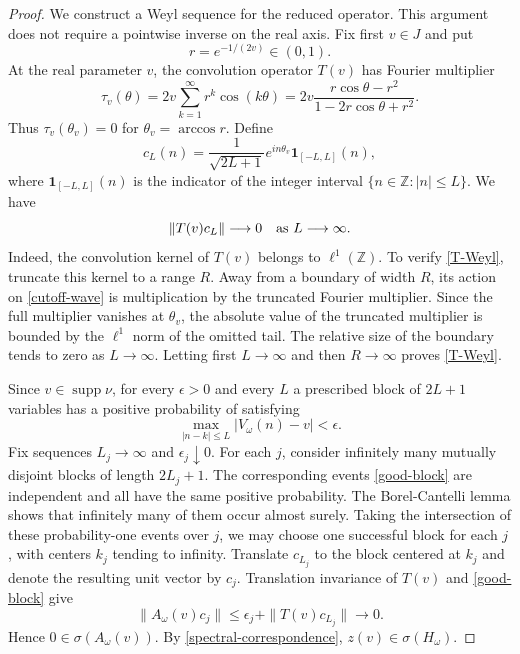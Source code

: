 \documentclass[10pt,a4paper]{amsart}
\newcommand{\Z}{\mathbb Z}
\newcommand{\supp}{\operatorname{supp}}
\begin{document}
\begin{proof}
We construct a Weyl sequence for the reduced operator.  This argument does
not require a pointwise inverse on the real axis.  Fix first
$v\in J$ and put
$$
r=e^{-1/(2v)}\in(0,1).
$$
At the real parameter $v$, the convolution operator $T(v)$ has Fourier
multiplier
\begin{equation}
\tau_v(\theta)
 =2v\sum_{k=1}^{\infty}r^k\cos(k\theta)
 =2v\frac{r\cos\theta-r^2}
 {1-2r\cos\theta+r^2}.
\label{T-symbol}
\end{equation}
Thus $\tau_v(\theta_v)=0$ for
$\theta_v=\arccos r$.  Define
\begin{equation}
 c_L(n)=\frac{1}{\sqrt{2L+1}}e^{in\theta_v}
 \boldsymbol 1_{[-L,L]}(n),
\label{cutoff-wave}
\end{equation}
where $\boldsymbol 1_{[-L,L]}(n)$ is the indicator of the integer interval
$\{n\in\Z:|n|\le L\}$.  We have
\begin{equation}
 \|T(v)c_L\|\longrightarrow0
 \quad\hbox{as }L\longrightarrow\infty.
\label{T-Weyl}
\end{equation}
Indeed, the convolution kernel of $T(v)$ belongs to $\ell^1(\Z)$.
To verify \eqref{T-Weyl}, truncate this kernel to a range $R$.  Away from a
boundary of width $R$, its action on \eqref{cutoff-wave} is multiplication by
the truncated Fourier multiplier.  Since the full multiplier vanishes at
$\theta_v$, the absolute value of the truncated multiplier is bounded by the
$\ell^1$ norm of the omitted tail.  The relative size of the boundary tends
to zero as $L\to\infty$.  Letting first $L\to\infty$ and then $R\to\infty$
proves \eqref{T-Weyl}.

Since $v\in\supp\nu$, for every $\epsilon>0$ and every $L$ a prescribed
block of $2L+1$ variables has a positive probability of satisfying
\begin{equation}
 \max_{|n-k|\le L}|V_\omega(n)-v|<\epsilon.
\label{good-block}
\end{equation}
Fix sequences $L_j\to\infty$ and $\epsilon_j\downarrow0$.  For each $j$,
consider infinitely many mutually disjoint blocks of length $2L_j+1$.
The corresponding events \eqref{good-block} are independent and all have the
same positive probability.  The Borel-Cantelli lemma shows that infinitely
many of them occur almost surely.  Taking the intersection of these
probability-one events over $j$, we may choose one successful block for each
$j$, with centers $k_j$ tending to infinity.  Translate
$c_{L_j}$ to the block centered at $k_j$ and denote the resulting unit vector
by $c_j$.  Translation invariance of $T(v)$ and \eqref{good-block} give
\begin{equation}
 \|A_\omega(v)c_j\|
 \le \epsilon_j+\|T(v)c_{L_j}\|\longrightarrow0.
\label{A-Weyl}
\end{equation}
Hence $0\in\sigma(A_\omega(v))$.  By
\eqref{spectral-correspondence}, $z(v)\in\sigma(H_\omega)$.


\end{proof}
\end{document}
